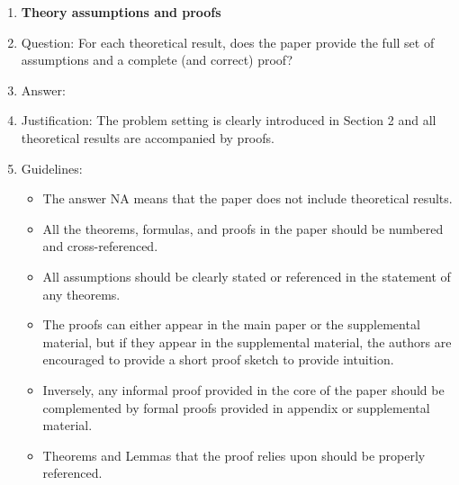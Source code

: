 \documentclass{article}
\theoremstyle{plain}
\theoremstyle{definition}
\theoremstyle{remark}
\begin{document}
\begin{enumerate}
\item {\bf Theory assumptions and proofs}
    \item[] Question: For each theoretical result, does the paper provide the full set of assumptions and a complete (and correct) proof?
    \item[] Answer: \answerYes{} %
    \item[] Justification: The problem setting is clearly introduced in Section 2 and all theoretical results are accompanied by proofs.
    \item[] Guidelines:
    \begin{itemize}
        \item The answer NA means that the paper does not include theoretical results. 
        \item All the theorems, formulas, and proofs in the paper should be numbered and cross-referenced.
        \item All assumptions should be clearly stated or referenced in the statement of any theorems.
        \item The proofs can either appear in the main paper or the supplemental material, but if they appear in the supplemental material, the authors are encouraged to provide a short proof sketch to provide intuition. 
        \item Inversely, any informal proof provided in the core of the paper should be complemented by formal proofs provided in appendix or supplemental material.
        \item Theorems and Lemmas that the proof relies upon should be properly referenced. 
    \end{itemize}


\end{enumerate}
\end{document}
